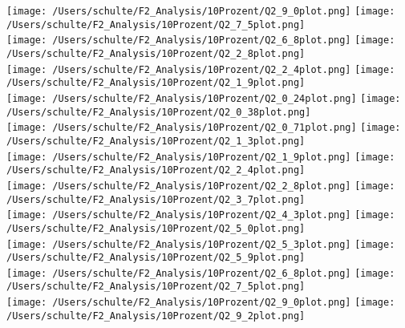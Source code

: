 \texttt{[image: /Users/schulte/F2\_Analysis/10Prozent/Q2\_9\_0plot.png]}
\texttt{[image: /Users/schulte/F2\_Analysis/10Prozent/Q2\_7\_5plot.png]}\\

\texttt{[image: /Users/schulte/F2\_Analysis/10Prozent/Q2\_6\_8plot.png]}
\texttt{[image: /Users/schulte/F2\_Analysis/10Prozent/Q2\_2\_8plot.png]}\\

\texttt{[image: /Users/schulte/F2\_Analysis/10Prozent/Q2\_2\_4plot.png]}
\texttt{[image: /Users/schulte/F2\_Analysis/10Prozent/Q2\_1\_9plot.png]}
\\
\texttt{[image: /Users/schulte/F2\_Analysis/10Prozent/Q2\_0\_24plot.png]}
\texttt{[image: /Users/schulte/F2\_Analysis/10Prozent/Q2\_0\_38plot.png]}\\

\texttt{[image: /Users/schulte/F2\_Analysis/10Prozent/Q2\_0\_71plot.png]}
\texttt{[image: /Users/schulte/F2\_Analysis/10Prozent/Q2\_1\_3plot.png]}
\\
\texttt{[image: /Users/schulte/F2\_Analysis/10Prozent/Q2\_1\_9plot.png]}
\texttt{[image: /Users/schulte/F2\_Analysis/10Prozent/Q2\_2\_4plot.png]}
\\
\texttt{[image: /Users/schulte/F2\_Analysis/10Prozent/Q2\_2\_8plot.png]}
\texttt{[image: /Users/schulte/F2\_Analysis/10Prozent/Q2\_3\_7plot.png]}
\\
\texttt{[image: /Users/schulte/F2\_Analysis/10Prozent/Q2\_4\_3plot.png]}
\texttt{[image: /Users/schulte/F2\_Analysis/10Prozent/Q2\_5\_0plot.png]}\\

\texttt{[image: /Users/schulte/F2\_Analysis/10Prozent/Q2\_5\_3plot.png]}
\texttt{[image: /Users/schulte/F2\_Analysis/10Prozent/Q2\_5\_9plot.png]}\\

\texttt{[image: /Users/schulte/F2\_Analysis/10Prozent/Q2\_6\_8plot.png]}
\texttt{[image: /Users/schulte/F2\_Analysis/10Prozent/Q2\_7\_5plot.png]}\\

\texttt{[image: /Users/schulte/F2\_Analysis/10Prozent/Q2\_9\_0plot.png]}
\texttt{[image: /Users/schulte/F2\_Analysis/10Prozent/Q2\_9\_2plot.png]}\\

